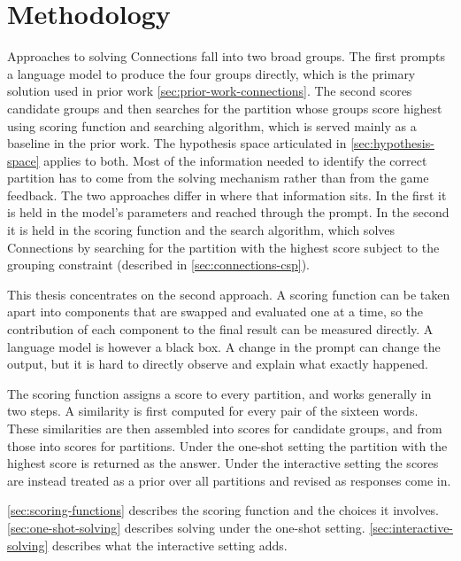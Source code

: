 \chapter{Methodology}
\label{chap:method}

Approaches to solving Connections fall into two broad groups. The first prompts a language model to produce the four groups directly, which is the primary solution used in prior work \autoref{sec:prior-work-connections}. The second scores candidate groups and then searches for the partition whose groups score highest using scoring function and searching algorithm, which is served mainly as a baseline in the prior work. The hypothesis space articulated in \autoref{sec:hypothesis-space} applies to both. Most of the information needed to identify the correct partition has to come from the solving mechanism rather than from the game feedback. The two approaches differ in where that information sits. In the first it is held in the model's parameters and reached through the prompt. In the second it is held in the scoring function and the search algorithm, which solves Connections by searching for the partition with the highest score subject to the grouping constraint (described in \autoref{sec:connections-csp}).

This thesis concentrates on the second approach. A scoring function can be taken apart into components that are swapped and evaluated one at a time, so the contribution of each component to the final result can be measured directly. A language model is however a black box. A change in the prompt can change the output, but it is hard to directly observe and explain what exactly happened.

The scoring function assigns a score to every partition, and works generally in two steps. A similarity is first computed for every pair of the sixteen words. These similarities are then assembled into scores for candidate groups, and from those into scores for partitions. Under the one-shot setting the partition with the highest score is returned as the answer. Under the interactive setting the scores are instead treated as a prior over all partitions and revised as responses come in.

\autoref{sec:scoring-functions} describes the scoring function and the choices it involves. \autoref{sec:one-shot-solving} describes solving under the one-shot setting. \autoref{sec:interactive-solving} describes what the interactive setting adds.

